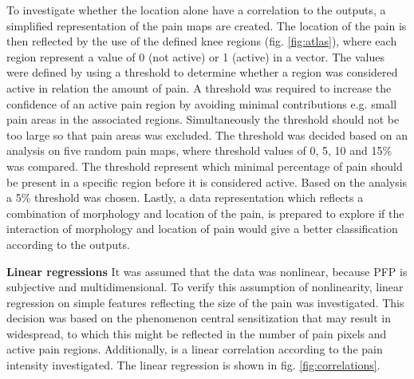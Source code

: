 \noindent
To investigate whether the location alone have a correlation to the outputs, a simplified representation of the pain maps are created. The location of the pain is then reflected by the use of the defined knee regions (fig. \ref{fig:atlas}), where each region represent a value of 0 (not active) or 1 (active) in a vector.  The values were defined by using a threshold to determine whether a region was considered active in relation the amount of pain. A threshold was required to increase the confidence of an active pain region by avoiding minimal contributions e.g. small pain areas in the associated regions. Simultaneously the threshold should not be too large so that pain areas was excluded. The threshold was decided based on an analysis on five random pain maps, where threshold values of 0, 5, 10 and 15\% was compared. The threshold represent which minimal percentage of pain should be present in a specific region before it is considered active. Based on the analysis a 5\% threshold was chosen. \newline
\noindent
Lastly, a data representation which reflects a combination of morphology and location of the pain, is prepared to explore if the interaction of morphology and location of pain would give a better classification according to the outputs. \newline

\noindent
\textbf{Linear regressions} \newline
\noindent
It was assumed that the data was nonlinear, because PFP is subjective and multidimensional. To verify this assumption of nonlinearity, linear regression on simple features reflecting the size of the pain was investigated. This decision was based on the phenomenon central sensitization that may result in widespread, to which this might be reflected in the number of pain pixels and active pain regions. 
Additionally, is a linear correlation according to the pain intensity investigated. The linear regression is shown in fig. \ref{fig:correlations}.




